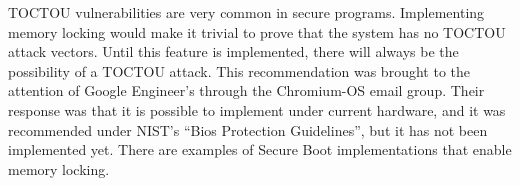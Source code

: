 TOCTOU vulnerabilities are very common in secure programs\cite{tpm-toctou}.
Implementing memory locking would make it trivial to prove that the system has
no TOCTOU attack vectors. 
Until this feature is implemented, there will always be the possibility of a
TOCTOU attack.
This recommendation was brought to the attention of Google Engineer's through
the Chromium-OS email group.
Their response was that it is possible to implement under current hardware, and
it was recommended under NIST's ``Bios Protection Guidelines'', but it has not
been implemented yet.
There are examples of Secure Boot implementations that enable memory locking\cite{elane}.

% 
